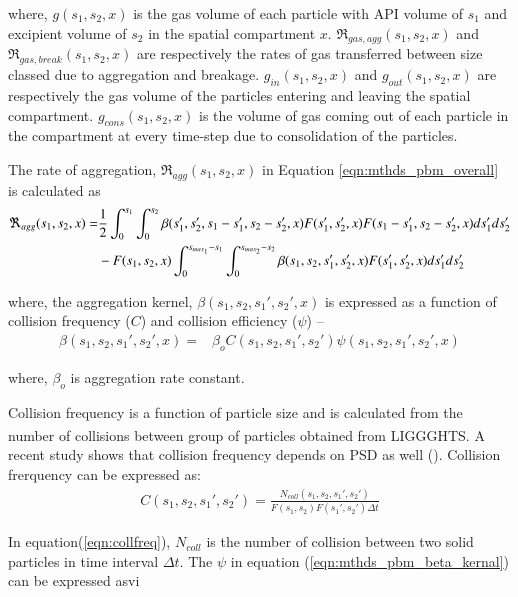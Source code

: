 \documentclass[preprint,11pt,authoryear]{elsarticle}
\begin{document}
	    \par where, $g(s_1,s_2,x)$ is the gas volume of each particle with API volume of $s_1$ and excipient volume of $s_2$ in the spatial compartment $x$. $\Re_{gas,agg}(s_1,s_2,x)$ and $\Re_{gas,break}(s_1,s_2,x)$ are respectively the rates of gas transferred between size classed due to aggregation and breakage. $g_{in}(s_1,s_2,x)$ and $g_{out}(s_1,s_2,x)$ are respectively the gas volume of the particles entering and leaving the spatial compartment. $g_{cons}(s_1,s_2,x)$ is the volume of gas coming out of each particle in the compartment at every time-step due to consolidation of the particles. 
	    \par The rate of aggregation, $\Re_{agg}(s_1,s_2,x)$ in Equation \ref{eqn:mthds_pbm_overall} is calculated as  
	     \begin{align}
	     \Re_{agg}(s_1,s_2,x)=& \frac{1}{2}\int _0^{s_1} \int_0^{s_2} \beta(s_1',s_2',s_1-s_1',s_2-s_2',x)F(s_1',s_2',x)F(s_1-s_1',s_2-s_2',x)ds_1'ds_2'\notag\\ 
	     &- F(s_1,s_2,x)\int _0^{s_{max_1}-s_1} \int_0^{s_{max_2}-s_2} \beta(s_1,s_2,s_1',s_2',x)F(s_1',s_2',x)ds_1'ds_2'
	     \end{align}
	     
	    \par where, the aggregation kernel, $\beta(s_1,s_2, s_1',s_2',x)$ is expressed as a function of collision frequency ($C$) and collision efficiency ($\psi$) –
	    \begin{align}
	    \beta(s_1,s_2,s_1',s_2',x) = & \beta_oC(s_1,s_2,s_1',s_2')\psi(s_1,s_2,s_1',s_2',x)
	    \label{eqn:mthds_pbm_beta_kernal}
	    \end{align}
	    
	    where, $\beta_o$ is aggregation rate constant.
	    \par Collision frequency is a function of particle size and is calculated from the number of collisions between group of particles obtained from LIGGGHTS\textsuperscript{\textregistered}. A recent study shows that collision frequency depends on PSD as well (\cite{sen2014}). Collision frerquency can be expressed as:
	    \begin{align}
	    C(s_1,s_2,s_1',s_2')=\frac{N_{coll}(s_1,s_2,s_1',s_2')}{F(s_1,s_2)F(s_1',s_2')\Delta t}
	    \label{eqn:collfreq}
	    \end{align}
	    \par In equation(\ref{eqn:collfreq}), $N_{coll}$ is the number of collision between two solid particles in time interval $\Delta t$. The $\psi$ in equation (\ref{eqn:mthds_pbm_beta_kernal}) can be expressed asvi 
	    
\end{document}
